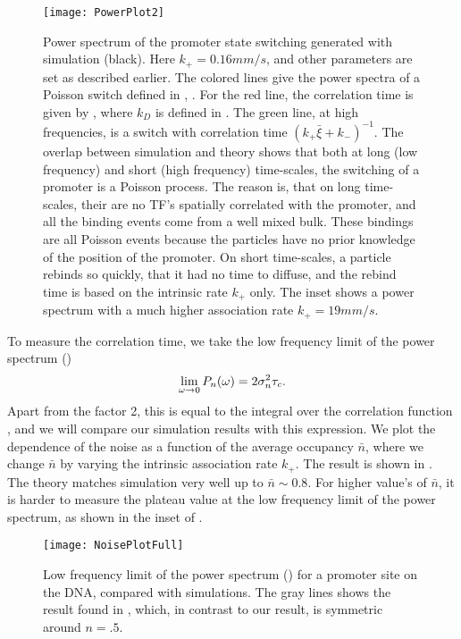 \begin{figure}
\texttt{[image: PowerPlot2]}
\caption{ Power spectrum of the promoter state switching generated with simulation (black). Here $k_+=0.16mm/s$, and other parameters are set as described earlier. The colored lines give the power spectra of a Poisson switch defined in , . For the red line, the correlation time is given by , where $k_D$ is defined in . The green line, at high frequencies, is a switch with correlation time $(k_+ \bar{\xi}+k_-)^{-1}$. The overlap between simulation and theory shows that both at long (low frequency) and short (high frequency) time-scales, the switching of a promoter is a Poisson process. The reason is, that on long time-scales, their are no TF's spatially correlated with the promoter, and all the binding events come from a well mixed bulk. These bindings are all Poisson events because the particles have no prior knowledge of the position of the promoter. On short time-scales, a particle rebinds so quickly, that it had no time to diffuse, and the rebind time is based on the intrinsic rate $k_+$ only. The inset shows a power spectrum with a much higher association rate $k_+=19 mm/s$. 
}
\end{figure}

To measure the correlation time, we take the low frequency limit of the power spectrum ()
\begin{equation}
 \lim_{\omega\to0} P_n(\omega) = 2 \sigma_n^2 \tau_c.
 \elabel{PowPro}
\end{equation}
Apart from the factor 2, this is equal to the integral over the correlation function , and we will compare our simulation results with this expression. We plot the dependence of the noise as a function of the average occupancy $\bar{n}$, where we change $\bar{n}$ by varying the intrinsic association rate $k_+$. The result is shown in . The theory matches simulation very well up to $\bar{n}\sim0.8$. For higher value's of $\bar{n}$, it is harder to measure the plateau value at the low frequency limit of the power spectrum, as shown in the inset of . 

\begin{figure}
\centering
\texttt{[image: NoisePlotFull]}
\caption{ Low frequency limit of the power spectrum () for a promoter site on the DNA, compared with simulations. The gray lines shows the result found in \cite{Tkacik2009}, which, in contrast to our result, is symmetric around $n=.5$.}
\end{figure}



